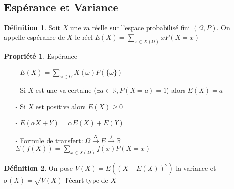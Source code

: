 \documentclass[fleqn]{article}
\theoremstyle{definition} \newtheorem*{defi}{D\'efinition}
\theoremstyle{definition} \newtheorem*{theo}{Th\'eor\`eme}
\theoremstyle{definition} \newtheorem*{coro}{Corollaire}
\theoremstyle{remark} \newtheorem*{rqs}{Remarques}
\theoremstyle{definition} \newtheorem*{prop}{Propri\'et\'e}
\begin{document}
\subsection{Esp\'erance et Variance}
\begin{defi}
	Soit $X$ une va r\'eelle sur l'espace probabilis\'e fini $(\Omega, P)$. On appelle esp\'erance de $X$ le r\'eel $E(X) =
	\sum_{x \in X(\Omega)} xP(X=x)$
\end{defi}

\begin{prop} Esp\'erance
	\begin{itemize}
		\item [-] $E(X) = \sum_{\omega \in \Omega} X(\omega) P(\{\omega\})$
		\item [-] Si $X$ est une va certaine ($\exists a \in \mathbb{R}, P(X=a) = 1$) alors $E(X) = a$
		\item [-] Si $X$ est positive alors $E(X) \geq 0$
		\item [-] $E(\alpha X + Y) = \alpha E(X) + E(Y)$
		\item [-] Formule de transfert: $\Omega \overset{X}{\rightarrow} E \overset{f}{\rightarrow}\mathbb{R}$ \\
			$E(f(X)) = \sum_{x \in X(\Omega)} f(x) P(X=x)$
	\end{itemize}
\end{prop}

\begin{defi}
	On pose $V(X) = E((X - E(X))^2)$ la variance et $\sigma(X) = \sqrt{V(X)}$ l'\'ecart type de $X$
\end{defi}
\end{document}
